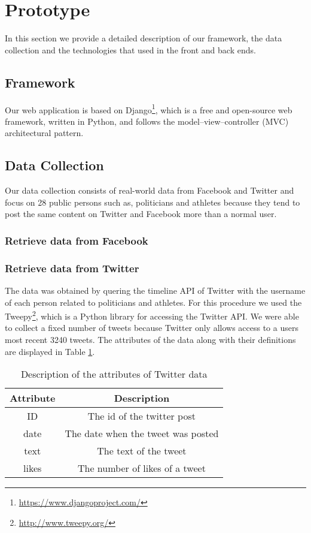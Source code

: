 \section{Prototype}

In this section we provide a detailed description of our framework, the data collection and the technologies that used in the front and back ends.


\subsection{Framework}

Our web application is based on Django\footnote{\url{https://www.djangoproject.com/}}, which is a free and open-source web framework, written in Python, and follows the model–view–controller (MVC) architectural pattern.

\subsection{Data Collection}

Our data collection consists of real-world data from Facebook 
and Twitter and focus on 28 public persons such as, politicians 
and athletes because they tend to post the same content on Twitter and Facebook more than a normal user.

\subsubsection{Retrieve data from Facebook}
 

\subsubsection{Retrieve data from Twitter}

The data was obtained by quering the timeline API of Twitter with the username of each person related to politicians and athletes. For this procedure we used the Tweepy\footnote{\url{http://www.tweepy.org/}}, which is a Python library for accessing the Twitter API. We were able to collect a fixed number of tweets because Twitter only allows access to a users most recent 3240 tweets. The attributes of the data along with their definitions
are displayed in Table \ref{table:attrib_des}.

\begin{table}[ht] 
\caption{Description of the attributes of Twitter data} 
\centering  
\begin{tabular}{c | c} 
\hline\hline 
Attribute & Description \\ [0.5ex] 
\hline 
ID & The id of the twitter post \\ 
date & The date when the tweet was posted \\ 
text & The text of the tweet\\ 
likes & The number of likes of a tweet \\ [1ex]  
\hline  
\end{tabular} 
\label{table:attrib_des}
\end{table} 

